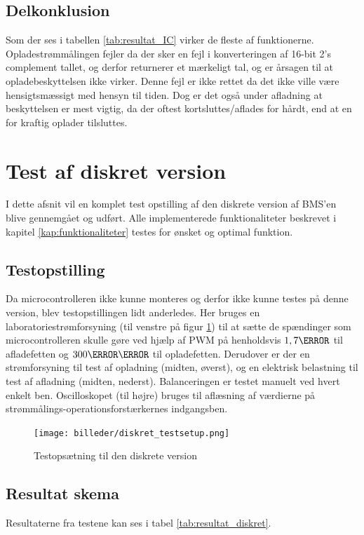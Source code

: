 \subsection{Delkonklusion}
Som der ses i tabellen \ref{tab:resultat_IC} virker de fleste af funktionerne. Opladestrømmålingen fejler da der sker en fejl i konverteringen af 16-bit 2's complement tallet, og derfor returnerer et mærkeligt tal, og er årsagen til at opladebeskyttelsen ikke virker. Denne fejl er ikke rettet da det ikke ville være hensigtsmæssigt med hensyn til tiden. Dog er det også under afladning at beskyttelsen er mest vigtig, da der oftest kortsluttes/aflades for hårdt, end at en for kraftig oplader tilsluttes.

\section{Test af diskret version}\label{afs:test_diskret}
I dette afsnit vil en komplet test opstilling af den diskrete version af BMS'en blive gennemgået og udført. Alle implementerede funktionaliteter beskrevet i kapitel \ref{kap:funktionaliteter} testes for ønsket og optimal funktion. 

\subsection{Testopstilling}
Da microcontrolleren ikke kunne monteres og derfor ikke kunne testes på denne version, blev testopstillingen lidt anderledes. Her bruges en laboratoriestrømforsyning (til venstre på figur \ref{fig:diskret_testsetup}) til at sætte de spændinger som microcontrolleren skulle gøre ved hjælp af PWM på henholdsvis $1,7\volt$ til afladefetten og $300\milli\volt$ til opladefetten. Derudover er der en strømforsyning til test af opladning (midten, øverst), og en elektrisk belastning til test af afladning (midten, nederst). Balanceringen er testet manuelt ved hvert enkelt ben. Oscilloskopet (til højre) bruges til aflæsning af værdierne på strømmålings-operationsforstærkernes indgangsben.

\begin{figure}[h]
	\centering
	\texttt{[image: billeder/diskret\_testsetup.png]}
	\caption{Testopsætning til den diskrete version}
	\label{fig:diskret_testsetup}
\end{figure}

\subsection{Resultat skema}
Resultaterne fra testene kan ses i tabel \ref{tab:resultat_diskret}.

